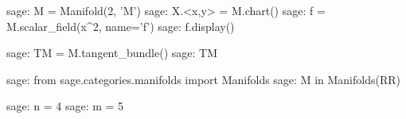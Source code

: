 \documentclass[12pt]{article}
\begin{document}
\lipsum[2-3]
\begin{sagenotebook}
sage: M = Manifold(2, 'M')
sage: X.<x,y> = M.chart()
sage: f = M.scalar_field(x^2, name='f')
sage: f.display()
\end{sagenotebook}
\par
\begin{sagenotebook}
sage: TM = M.tangent_bundle()
sage: TM
\end{sagenotebook}
\begin{sagenotebook}
sage: from sage.categories.manifolds import Manifolds
sage: M in Manifolds(RR)
\end{sagenotebook}
\lipsum
\begin{sagenotebook}
sage: n = 4
sage: m = 5
\end{sagenotebook}
\lipsum
\end{document}
